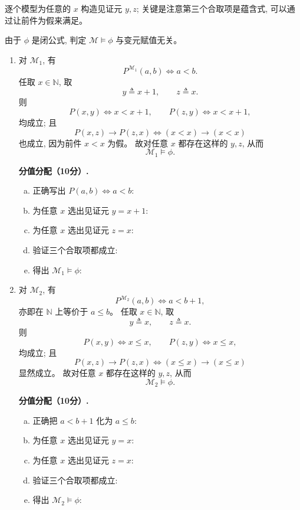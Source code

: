 \documentclass[a4paper, justified]{tufte-handout}
\begin{document}
\begin{solution}
  \begin{intention}
    逐个模型为任意的 $x$ 构造见证元 $y, z$; 关键是注意第三个合取项是蕴含式, 可以通过让前件为假来满足。
  \end{intention}

  由于 $\phi$ 是闭公式, 判定 $\mathcal{M} \models \phi$ 与变元赋值无关。

  \begin{enumerate}[(1)]
    \item 对 $\mathcal{M}_{1}$, 有
      \[
        P^{\mathcal{M}_{1}}(a, b) \iff a < b.
      \]
      任取 $x \in \mathbb{N}$, 取
      \[
        y \triangleq x + 1,
        \qquad
        z \triangleq x.
      \]
      则
      \[
        P(x, y) \iff x < x + 1,
        \qquad
        P(z, y) \iff x < x + 1,
      \]
      均成立; 且
      \[
        P(x, z) \to P(z, x)
        \iff
        (x < x) \to (x < x)
      \]
      也成立, 因为前件 $x < x$ 为假。
      故对任意 $x$ 都存在这样的 $y, z$, 从而
      \[
        \mathcal{M}_{1} \models \phi.
      \]

      \textbf{分值分配（10分）.}
      \begin{enumerate}[(a)]
        \item 正确写出 $P(a, b) \iff a < b$: 
        \item 为任意 $x$ 选出见证元 $y = x + 1$: 
        \item 为任意 $x$ 选出见证元 $z = x$: 
        \item 验证三个合取项都成立: 
        \item 得出 $\mathcal{M}_{1} \models \phi$: 
      \end{enumerate}

    \item 对 $\mathcal{M}_{2}$, 有
      \[
        P^{\mathcal{M}_{2}}(a, b) \iff a < b + 1,
      \]
      亦即在 $\mathbb{N}$ 上等价于 $a \le b$。
      任取 $x \in \mathbb{N}$, 取
      \[
        y \triangleq x,
        \qquad
        z \triangleq x.
      \]
      则
      \[
        P(x, y) \iff x \le x,
        \qquad
        P(z, y) \iff x \le x,
      \]
      均成立; 且
      \[
        P(x, z) \to P(z, x)
        \iff
        (x \le x) \to (x \le x)
      \]
      显然成立。
      故对任意 $x$ 都存在这样的 $y, z$, 从而
      \[
        \mathcal{M}_{2} \models \phi.
      \]

      \textbf{分值分配（10分）.}
      \begin{enumerate}[(a)]
        \item 正确把 $a < b + 1$ 化为 $a \le b$: 
        \item 为任意 $x$ 选出见证元 $y = x$: 
        \item 为任意 $x$ 选出见证元 $z = x$: 
        \item 验证三个合取项都成立: 
        \item 得出 $\mathcal{M}_{2} \models \phi$: 
      \end{enumerate}
  \end{enumerate}


\end{solution}
\end{document}
